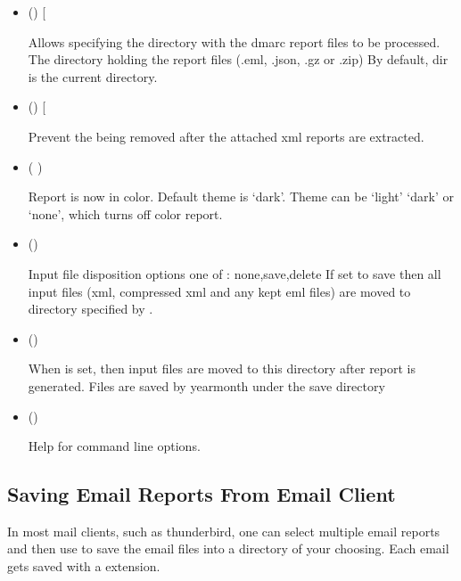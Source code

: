 \documentclass[letterpaper,10pt,english]{sphinxmanual}
\begin{document}
\begin{itemize}
\item {} 
\sphinxAtStartPar
() {[}\sphinxstyleemphasis{dir = /some/path}{]}

\sphinxAtStartPar
Allows specifying the directory with the dmarc report files to be processed.
The directory holding the report files (.eml, .json, .gz or .zip)
By default, dir is the current directory.

\item {} 
\sphinxAtStartPar
() {[}\sphinxstyleemphasis{keep = true}{]}

\sphinxAtStartPar
Prevent the  being removed after the attached xml reports are extracted.

\item {} 
\sphinxAtStartPar
( )

\sphinxAtStartPar
Report is now in color.
Default theme is ‘dark’. Theme can be ‘light’ ‘dark’ or ‘none’, which turns off color report.

\item {} 
\sphinxAtStartPar
()

\sphinxAtStartPar
Input file disposition options one of : none,save,delete
If set to save then all input files (xml, compressed xml and any kept eml files) are moved
to directory specified by .

\item {} 
\sphinxAtStartPar
()

\sphinxAtStartPar
When  is set, then input files are moved to this directory after report
is generated.  Files are saved by year\sphinxhyphen{}month under the save directory

\item {} 
\sphinxAtStartPar
()

\sphinxAtStartPar
Help for command line options.

\end{itemize}


\subsection{Saving Email Reports From Email Client}
\label{\detokenize{Readme-TLS:saving-email-reports-from-email-client}}
\sphinxAtStartPar
In most mail clients, such as thunderbird,  one can select multiple email reports and
then use  to save the email files into a directory of your choosing.
Each email gets saved with a  extension.
\end{document}
